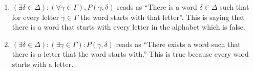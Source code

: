\begin{example}
\begin{enumerate}
\begin{enumerate}[label=(\alph*)]
                \item $(\exists \delta \in \Delta) : (\forall \gamma \in \Gamma), P(\gamma,\delta)$ reads as ``There is a word $\delta \in \Delta$ such that for every letter $\gamma \in \Gamma$ the word starts with that letter''. This is saying that there is a word that starts with every letter in the alphabet which is false.

                \item $(\exists \delta \in \Delta) : (\exists \gamma \in \Gamma) : P(\gamma,\delta)$ reads as ``There exists a word such that there is a letter that the word starts with.'' This is true because every word starts with a letter.
            \end{enumerate}
    \end{enumerate}
    \label{ex:oxfordquantifier}
\end{example}

